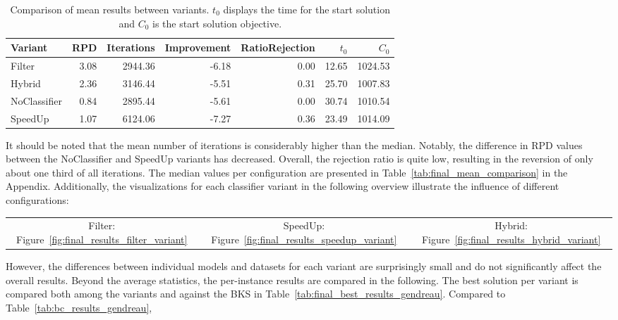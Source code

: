 \begin{table}
    \centering
    \small
    \begin{tabular}{lrrrrrr}
        \toprule
        Variant      & RPD  & Iterations & Improvement & RatioRejection & $t_0$ & $C_0$   \\
        \midrule
        Filter       & 3.08 & 2944.36    & -6.18       & 0.00           & 12.65 & 1024.53 \\
        Hybrid       & 2.36 & 3146.44    & -5.51       & 0.31           & 25.70 & 1007.83 \\
        NoClassifier & 0.84 & 2895.44    & -5.61       & 0.00           & 30.74 & 1010.54 \\
        SpeedUp      & 1.07 & 6124.06    & -7.27       & 0.36           & 23.49 & 1014.09 \\
        \bottomrule
    \end{tabular}
    \caption[Comparison of mean results between variants.]{Comparison of mean results between variants. $t_0$ displays the time for the start solution and $C_0$ is the start solution objective.}
    \label{tab:mean_final_results}
\end{table}
It should be noted that the mean number of iterations is considerably higher than the median. Notably, the difference in \gls{RPD}
values between the NoClassifier and SpeedUp variants has decreased. Overall, the rejection ratio is quite low, resulting in
the reversion of only about one third of all iterations. The median values per configuration are presented in
Table~\ref{tab:final_mean_comparison} in the Appendix. Additionally, the visualizations for each classifier variant in the following overview
illustrate the influence of different configurations:
\begin{table}[ht]
    \centering
    \setlength{\tabcolsep}{12pt}
    \begin{tabular}{ccc}
        Filter: Figure~\ref{fig:final_results_filter_variant} & SpeedUp: Figure~\ref{fig:final_results_speedup_variant} & Hybrid: Figure~\ref{fig:final_results_hybrid_variant}
    \end{tabular}
\end{table}
However, the differences between individual models and datasets for each variant are surprisingly small and do not significantly
affect the overall results. Beyond the average statistics, the per-instance results are compared in the following. The best solution
per variant is compared both among the variants and against the \gls{BKS} in Table~\ref{tab:final_best_results_gendreau}. Compared to Table~\ref{tab:bc_results_gendreau},
